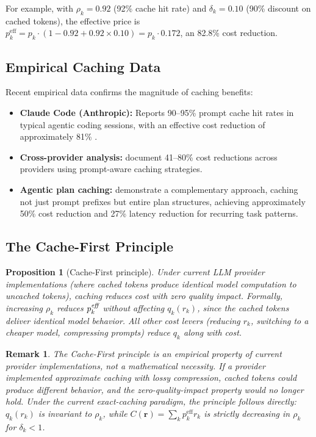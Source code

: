 \documentclass[11pt, a4paper, copyright]{googledeepmind}
\newtheorem{proposition}{Proposition}[section]
\newtheorem*{remark}{Remark}
\begin{document}
For example, with $\rho_k = 0.92$ (92\% cache hit rate) and $\delta_k = 0.10$ (90\% discount on cached tokens), the effective price is $p_k^{\text{eff}} = p_k \cdot (1 - 0.92 + 0.92 \times 0.10) = p_k \cdot 0.172$, an 82.8\% cost reduction.

\subsection{Empirical Caching Data}

Recent empirical data confirms the magnitude of caching benefits:
\begin{itemize}[nosep]
    \item \textbf{Claude Code (Anthropic):} Reports 90--95\% prompt cache hit rates in typical agentic coding sessions, with an effective cost reduction of approximately 81\% \citep{anthropic2026coding}.
    \item \textbf{Cross-provider analysis:} \citet{liang2026cache} document 41--80\% cost reductions across providers using prompt-aware caching strategies.
    \item \textbf{Agentic plan caching:} \citet{zhang2025plancache} demonstrate a complementary approach, caching not just prompt prefixes but entire plan structures, achieving approximately 50\% cost reduction and 27\% latency reduction for recurring task patterns.
\end{itemize}

\subsection{The Cache-First Principle}

\begin{proposition}[Cache-First principle]\label{thm:cache-first}
Under current LLM provider implementations (where cached tokens produce identical model computation to uncached tokens), caching reduces cost with zero quality impact. Formally, increasing $\rho_k$ reduces $p_k^{\emph{eff}}$ without affecting $q_k(r_k)$, since the cached tokens deliver identical model behavior. All other cost levers (reducing $r_k$, switching to a cheaper model, compressing prompts) reduce $q_k$ along with cost.
\end{proposition}

\begin{remark}
The Cache-First principle is an empirical property of current provider implementations, not a mathematical necessity. If a provider implemented approximate caching with lossy compression, cached tokens could produce different behavior, and the zero-quality-impact property would no longer hold. Under the current exact-caching paradigm, the principle follows directly: $q_k(r_k)$ is invariant to $\rho_k$, while $C(\mathbf{r}) = \sum_k p_k^{\text{eff}} r_k$ is strictly decreasing in $\rho_k$ for $\delta_k < 1$.
\end{remark}
\end{document}
